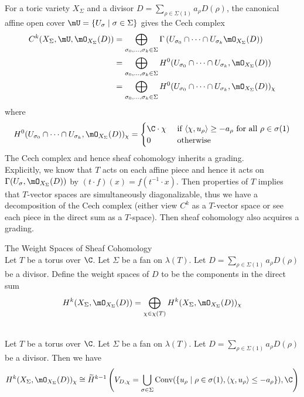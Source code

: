 \documentclass[a4paper]{article}
\begin{document}
For a toric variety $X_\Sigma$ and a divisor $D=\sum_{\rho\in\Sigma(1)}a_\rho D(\rho)$, the canonical affine open cover $\mU=\{U_\sigma\;|\;\sigma\in\Sigma\}$ gives the Cech complex 
\begin{align*}
C^k(X_\Sigma,\mU,\mO_{X_\Sigma}(D))&=\bigoplus_{\sigma_0,\dots,\sigma_k\in\Sigma}\Gamma\left(U_{\sigma_0}\cap\cdots\cap U_{\sigma_k}\mO_{X_\Sigma}(D)\right)\\
&=\bigoplus_{\sigma_0,\dots,\sigma_k\in\Sigma}H^0(U_{\sigma_0}\cap\cdots\cap U_{\sigma_k},\mO_{X_\Sigma}(D))\\
&=\bigoplus_{\sigma_0,\dots,\sigma_k\in\Sigma}H^0(U_{\sigma_0}\cap\cdots\cap U_{\sigma_k},\mO_{X_\Sigma}(D))_\chi
\end{align*}
where $$H^0(U_{\sigma_0}\cap\cdots\cap U_{\sigma_k},\mO_{X_\Sigma}(D))_\chi=\begin{cases}
\C\cdot\chi & \text{ if }\langle\chi,u_\rho\rangle\geq-a_\rho\text{ for all }\rho\in\sigma(1)\\
0 & \text{ otherwise }
\end{cases}$$ The Cech complex and hence sheaf cohomology inherits a grading. \\

Explicitly, we know that $T$ acts on each affine piece and hence it acts on $\Gamma(U_\sigma,\mO_{X_\Sigma}(D))$ by $(t\cdot f)(x)=f(t^{-1}\cdot x)$. Then properties of $T$ implies that $T$-vector spaces are simultaneously diagonalizable, thus we have a decomposition of the Cech complex (either view $C^k$ as a $T$-vector space or see each piece in the direct sum as a $T$-space). Then sheaf cohomology also acquires a grading. 

\begin{defn}{The Weight Spaces of Sheaf Cohomology}{}\\
Let $T$ be a torus over $\C$. Let $\Sigma$ be a fan on $\lambda(T)$. Let $D=\sum_{\rho\in\Sigma(1)}a_\rho D(\rho)$ be a divisor. Define the weight spaces of $D$ to be the components in the direct sum $$H^k(X_\Sigma,\mO_{X_\Sigma}(D))=\bigoplus_{\chi\in\chi(T)}H^k(X_\Sigma,\mO_{X_\Sigma}(D))_\chi$$
\end{defn}

\begin{prp}{}{}\\
Let $T$ be a torus over $\C$. Let $\Sigma$ be a fan on $\lambda(T)$. Let $D=\sum_{\rho\in\Sigma(1)}a_\rho D(\rho)$ be a divisor. Then we have $$H^k(X_\Sigma,\mO_{X_\Sigma}(D))_\chi\cong\widetilde{H}^{k-1}\left(V_{D,\chi}=\bigcup_{\sigma\in\Sigma}\text{Conv}(\{u_\rho\;|\;\rho\in\sigma(1),\langle\chi,u_\rho\rangle\leq-a_\rho\}),\C\right)$$
\end{prp}
\end{document}
